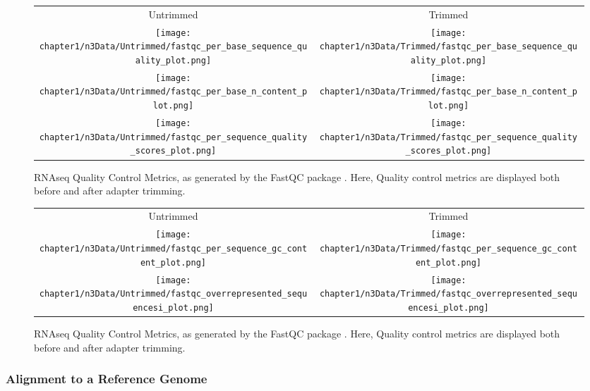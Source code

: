 \begin{figure*}[!hbtp]
\centering
\begin{tabular}{cc}
\small{Untrimmed} & \small{Trimmed} \\
  \texttt{[image: chapter1/n3Data/Untrimmed/fastqc\_per\_base\_sequence\_quality\_plot.png]} & \texttt{[image: chapter1/n3Data/Trimmed/fastqc\_per\_base\_sequence\_quality\_plot.png]} \\
  \texttt{[image: chapter1/n3Data/Untrimmed/fastqc\_per\_base\_n\_content\_plot.png]} & \texttt{[image: chapter1/n3Data/Trimmed/fastqc\_per\_base\_n\_content\_plot.png]} \\
  \texttt{[image: chapter1/n3Data/Untrimmed/fastqc\_per\_sequence\_quality\_scores\_plot.png]} & \texttt{[image: chapter1/n3Data/Trimmed/fastqc\_per\_sequence\_quality\_scores\_plot.png]} \\
\end{tabular}
\caption[RNAseq Quality Control metrics]{RNAseq Quality Control Metrics, as generated by the FastQC package \cite{Andrews2010}. Here, Quality control metrics are displayed both before and after adapter trimming.}
\label{fig:n3QCa}
\end{figure*}

\begin{figure*}[!hbtp]
\ContinuedFloat 
\centering
\begin{tabular}{cc}
\small{Untrimmed} & \small{Trimmed} \\
  \texttt{[image: chapter1/n3Data/Untrimmed/fastqc\_per\_sequence\_gc\_content\_plot.png]} & \texttt{[image: chapter1/n3Data/Trimmed/fastqc\_per\_sequence\_gc\_content\_plot.png]} \\
  \texttt{[image: chapter1/n3Data/Untrimmed/fastqc\_overrepresented\_sequencesi\_plot.png]} & \texttt{[image: chapter1/n3Data/Trimmed/fastqc\_overrepresented\_sequencesi\_plot.png]} \\
\end{tabular}
\caption[RNAseq Quality Control metrics, continued.]{RNAseq Quality Control Metrics, as generated by the FastQC package \cite{Andrews2010}. Here, Quality control metrics are displayed both before and after adapter trimming.}
\label{fig:n3QCb}
\end{figure*}



\subsubsection{Alignment to a Reference Genome}

